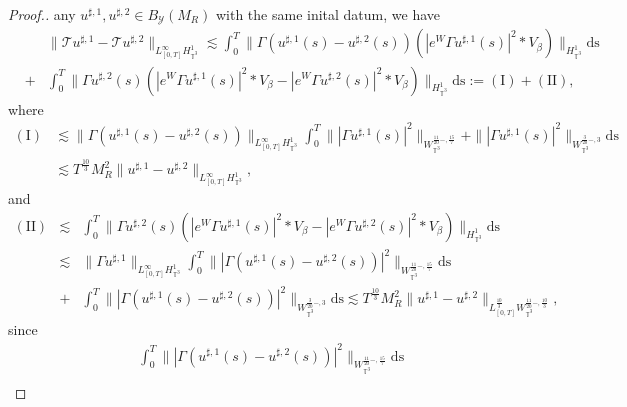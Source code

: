 \begin{proof}[Proof.]
  any $u^{\sharp, 1}, u^{\sharp, 2} \in B_{\mathcal{Y}} (M_R)$ with the same
  inital datum, we have
  \begin{eqnarray*}
    &  & \| \mathcal{T} u^{\sharp, 1} - \mathcal{T} u^{\sharp, 2} \|_{L_{[0,
    T]}^{\infty} H_{\mathbb{T}^3}^1} \lesssim \int^T_0 \| \Gamma (u^{\sharp,
    1} (s) - u^{\sharp, 2} (s)) (| e^W \Gamma u^{\sharp, 1} (s) |^2 \ast
    V_{\beta}) \|_{H^1_{\mathbb{T}^3}} \mathrm{ds}\\
    & + & \int^T_0 \| \Gamma u^{\sharp, 2} (s) (| e^W \Gamma u^{\sharp, 1}
    (s) |^2 \ast V_{\beta} - | e^W \Gamma u^{\sharp, 2} (s) |^2 \ast
    V_{\beta}) \|_{H^1_{\mathbb{T}^3}} \mathrm{ds} := (\mathrm{I}) + (\mathrm{II}),
  \end{eqnarray*}
  where
  \begin{align*}
    (\mathrm{I}) & \lesssim \| \Gamma (u^{\sharp, 1} (s) - u^{\sharp, 2} (s))
    \|_{L_{[0, T]}^{\infty} H^1_{\mathbb{T}^3}} \int^T_0  \| | \Gamma
    u^{\sharp, 1} (s) |^2 \|_{W_{{{\mathbb{T}^3} } }^{\frac{11}{20} -,
    \frac{15}{7}}} + \| | \Gamma u^{\sharp, 1} (s) |^2
    \|_{W_{\mathbb{T}^3}^{\frac{3}{20} -, 3}}  \mathrm{ds}\\
    & \lesssim T^{\frac{10}{3}} M^2_R \| u^{\sharp, 1} - u^{\sharp, 2}
    \|_{L_{[0, T]}^{\infty} H^1_{\mathbb{T}^3}},
  \end{align*}
  and
  \begin{eqnarray*}
    (\mathrm{II}) 
    & \lesssim & \int^T_0 \| \Gamma u^{\sharp, 2} (s) (| e^W
    \Gamma u^{\sharp, 1} (s) |^2 \ast V_{\beta} - | e^W \Gamma u^{\sharp, 2}
    (s) |^2 \ast V_{\beta}) \|_{H^1_{\mathbb{T}^3}} \mathrm{ds}\\
    & \lesssim & \| \Gamma u^{\sharp, 1} \|_{L_{[0, T]}^{\infty}
    H^1_{\mathbb{T}^3}} \int^T_0  \| | \Gamma (u^{\sharp, 1} (s) -
    u^{\sharp, 2} (s)) |^2 \|_{W_{{{\mathbb{T}^3} } }^{\frac{11}{20} -,
    \frac{15}{7}}}\mathrm{ds}\\
    & + & \int^T_0\| | \Gamma (u^{\sharp, 1} (s) - u^{\sharp, 2} (s)) |^2
    \|_{W_{\mathbb{T}^3}^{\frac{3}{20} -, 3}} \mathrm{ds}
     \lesssim  T^{\frac{10}{3}} M^2_R \| u^{\sharp, 1} - u^{\sharp, 2}
    \|_{L_{[0, T]}^{\frac{10}{3}} W_{\mathbb{T}^3}^{\frac{11}{20} -,
    \frac{10}{3}}},
  \end{eqnarray*}
  since
  \begin{eqnarray*}
    & & \int^T_0 \| | \Gamma (u^{\sharp, 1} (s) - u^{\sharp, 2} (s)) |^2
    \|_{W_{{{\mathbb{T}^3} } }^{\frac{11}{20} -, \frac{15}{7}}} \mathrm{ds} \\
    &

\end{eqnarray*}
\end{proof}
